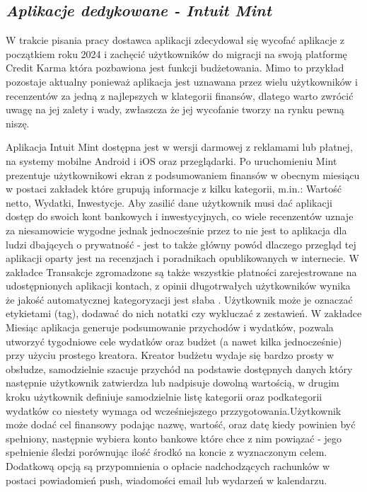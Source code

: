 \documentclass[a4paper,10pt, twoside]{report}
\newcommand{\customstylesection}[1]{\textbf{\textit{#1}}}
\begin{document}
\begin{large}
\section{\customstylesection{Aplikacje dedykowane - Intuit Mint}}
{W trakcie pisania pracy dostawca aplikacji zdecydował się wycofać aplikacje z 
początkiem roku 2024 i zachęcić użytkowników do migracji na swoją platformę 
Credit Karma \cite{mintwycofanie} która pozbawiona jest funkcji budżetowania. 
Mimo to przykład pozostaje aktualny ponieważ aplikacja jest uznawana przez wielu
 użytkowników i recenzentów za jedną z najlepszych w klategorii finansów, 
dlatego warto zwrócić uwagę na jej zalety i wady, zwłaszcza że jej wycofanie 
tworzy na rynku pewną niszę.}


{Aplikacja Intuit Mint \cite{mint}\cite{mintrecenzja} dostępna jest w wersji 
darmowej z reklamami lub płatnej, na systemy mobilne Android i iOS oraz 
przeglądarki. Po uruchomieniu Mint prezentuje użytkownikowi ekran z 
podsumowaniem finansów w obecnym miesiącu w postaci zakładek które grupują 
informacje z kilku kategorii, m.in.: Wartość netto, Wydatki, Inwestycje. Aby 
zasilić dane użytkownik musi dać aplikacji dostęp do swoich kont bankowych i 
inwestycyjnych, co wiele recenzentów uznaje za niesamowicie wygodne jednak 
jednocześnie przez to nie jest to aplikacja dla ludzi dbających o prywatność - 
jest to także główny powód dlaczego przegląd tej aplikacji oparty jest na 
recenzjach i poradnikach opublikowanych w internecie. W zakładce Transakcje 
zgromadzone są także wszystkie płatności zarejestrowane na udostępnionych 
aplikacji kontach, z opinii długotrwałych użytkowników wynika że jakość 
automatycznej kategoryzacji jest 
słaba \cite{porownanieaplikacji1}\cite{porownanieaplikacji2}\cite{porownanieaplikacji3}\cite{porownanieaplikacji4}. 
Użytkownik może je oznaczać etykietami (tag), dodawać do nich notatki czy wykluczać z zestawień. W zakładce 
Miesiąc aplikacja generuje podsumowanie przychodów i wydatków, pozwala utworzyć 
tygodniowe cele wydatków oraz budżet (a nawet kilka jednocześnie) przy użyciu 
prostego kreatora. Kreator budżetu wydaje się bardzo prosty w obsłudze, 
samodzielnie szacuje przychód na podstawie dostępnych danych który następnie 
użytkownik zatwierdza lub nadpisuje dowolną wartością, w drugim kroku użytkownik
 definiuje samodzielnie listę kategorii oraz podkategorii wydatków co niestety 
wymaga od wcześniejszego przzygotowania.Użytkownik może dodać cel finansowy 
podając nazwę, wartość, oraz datę kiedy powinien być spełniony, następnie 
wybiera konto bankowe które chce z nim powiązać - jego spełnienie śledzi 
porównując ilość środkó na koncie z wyznaczonym celem. Dodatkową opcją są 
przypomnienia o opłacie nadchodzących rachunków w postaci powiadomień push, 
wiadomości email lub wydarzeń w kalendarzu.}


\end{large}
\end{document}
